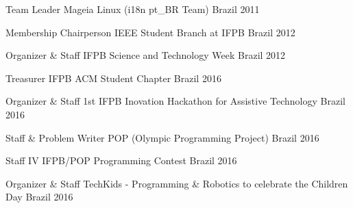 

\begin{cvhonors}

  \cvhonor
    {Team Leader} %
    {Mageia Linux (i18n pt\_BR Team)} %
    {Brazil} %
    {2011} %

  \cvhonor
    {Membership Chairperson} %
    {IEEE Student Branch at IFPB} %
    {Brazil} %
    {2012} %
    
  \cvhonor
    {Organizer \& Staff} %
    {IFPB Science and Technology Week} %
    {Brazil} %
    {2012} %

  \cvhonor
    {Treasurer} %
    {IFPB ACM Student Chapter} %
    {Brazil} %
    {2016} %

  \cvhonor
    {Organizer \& Staff} %
    {1st IFPB Inovation Hackathon for Assistive Technology} %
    {Brazil} %
    {2016} %

  \cvhonor
    {Staff \& Problem Writer} %
    {POP (Olympic Programming Project)} %
    {Brazil} %
    {2016} %
    
  \cvhonor
    {Staff} %
    {IV IFPB/POP Programming Contest} %
    {Brazil} %
    {2016} %
    
  \cvhonor
    {Organizer \& Staff} %
    {TechKids - Programming \& Robotics to celebrate the Children Day} %
    {Brazil} %
    {2016} %

\end{cvhonors}
